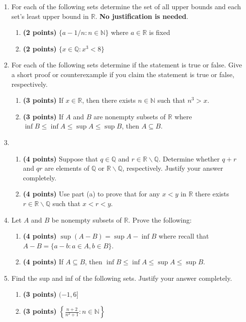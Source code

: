 \documentclass[10pt]{article}
\newcommand{\N}{\mathbb{N}}
\newcommand{\R}{\mathbb{R}}
\newcommand{\Q}{\mathbb{Q}}
\begin{document}
\begin{enumerate}

\item For each of the following sets determine the set of all upper bounds and each set's least upper bound in $\R$. \textbf{No justification is needed}. 
\begin{enumerate}
\item \textbf{(2 points)} $\{a-1/n: n\in \N\}$ where  $a\in \R$ is fixed
\item \textbf{(2 points)} $\{x\in \Q: x^3<8\}$
\end{enumerate}

\item For each of the following sets determine if the statement is true or false. Give a short proof or counterexample if you claim the statement is true or false, respectively. \begin{enumerate}
\item \textbf{(3 points)} If $x\in \R$, then there exists $n\in \N$ such that $n^3>x$. 
\item \textbf{(3 points)} If $A$ and $B$ are nonempty subsets of $\R$ where $\inf B\leq \inf A\leq \sup A\leq \sup B$, then $A\subseteq B$. 
\end{enumerate}

\item
\begin{enumerate}
\item \textbf{(4 points)} Suppose that $q\in \Q$ and $r\in \R\backslash \Q$. Determine whether $q+r$ and $qr$ are elements of $\Q$ or $\R\backslash \Q$, respectively. Justify your answer completely. 
\item \textbf{(4 points)} Use part (a) to prove that for any $x<y$ in $\R$ there exists $r\in \R\backslash \Q$ such that $x<r<y$. 
\end{enumerate}

\item Let $A$ and $B$ be nonempty subsets of $\R$. Prove the following:
\begin{enumerate}
\item \textbf{(4 points)} $\sup (A-B)=\sup A-\inf B$ where recall that $A-B=\{a-b: a\in A,b\in B\}$. 
\item \textbf{(4 points)} If $A\subseteq B$, then $\inf B\leq \inf A\leq \sup A\leq \sup B$. 
\end{enumerate}

\item Find the sup and inf of the following sets. Justify your answer completely. 
\begin{enumerate}
\item \textbf{(3 points)} $(-1,6]$
\item \textbf{(3 points)} $\displaystyle \left\{\frac{n+2}{n^2+1}: n\in \N\right\}$
\end{enumerate}


\end{enumerate}
\end{document}

